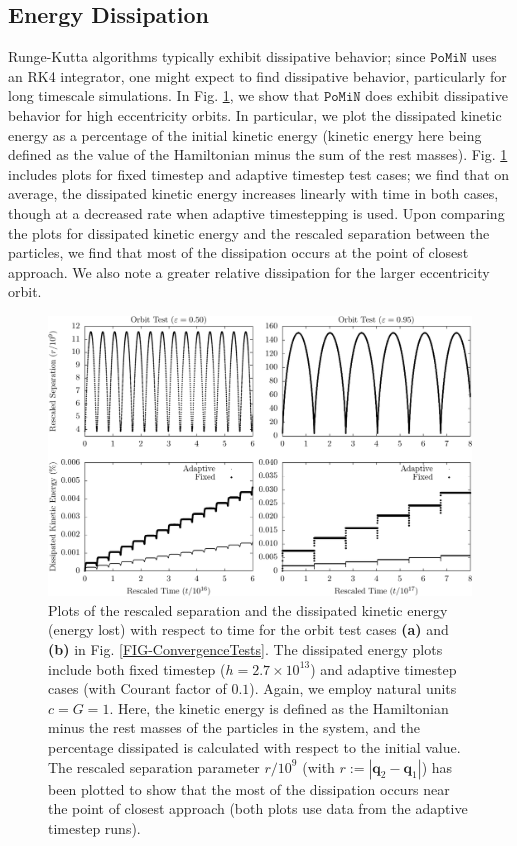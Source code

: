 \documentclass[aps,onecolumn,notitlepage,eqsecnum,nofootinbib,floatfix,superscriptaddress]{revtex4-1}
\newcommand{\codename}{\mathtt{PoMiN}}
\begin{document}
\subsection{Energy Dissipation}
\label{sec_dissipation}
Runge-Kutta algorithms typically exhibit dissipative behavior; since $\codename$ uses an RK4 integrator, one might expect to find dissipative behavior, particularly for long timescale simulations. In Fig. \ref{FIG-EnergyTests}, we show that $\codename$ does exhibit dissipative behavior for high eccentricity orbits. In particular, we plot the dissipated kinetic energy as a percentage of the initial kinetic energy (kinetic energy here being defined as the value of the Hamiltonian minus the sum of the rest masses). Fig. \ref{FIG-EnergyTests} includes plots for fixed timestep and adaptive timestep test cases; we find that on average, the dissipated kinetic energy increases linearly with time in both cases, though at a decreased rate when adaptive timestepping is used. Upon comparing the plots for dissipated kinetic energy and the rescaled separation between the particles, we find that most of the dissipation occurs at the point of closest approach. We also note a greater relative dissipation for the larger eccentricity orbit. 

 \begin{figure}
 \includegraphics[width=\linewidth]{energy_tests.pdf}
\caption{Plots of the rescaled separation and the dissipated kinetic energy (energy lost) with respect to time for the orbit test cases \textbf{(a)} and \textbf{(b)} in Fig. \ref{FIG-ConvergenceTests}. The dissipated energy plots include both fixed timestep ($h=2.7 \times 10^{13}$) and adaptive timestep cases (with Courant factor of $0.1$). Again, we employ natural units $c=G=1$. Here, the kinetic energy is defined as the Hamiltonian minus the rest masses of the particles in the system, and the percentage dissipated is calculated with respect to the initial value. The rescaled separation parameter $r/10^{9}$ (with $r:=|\textbf{q}_2-\textbf{q}_1|$) has been plotted to show that the most of the dissipation occurs near the point of closest approach (both plots use data from the adaptive timestep runs).}
\label{FIG-EnergyTests}
\end{figure}
\end{document}
